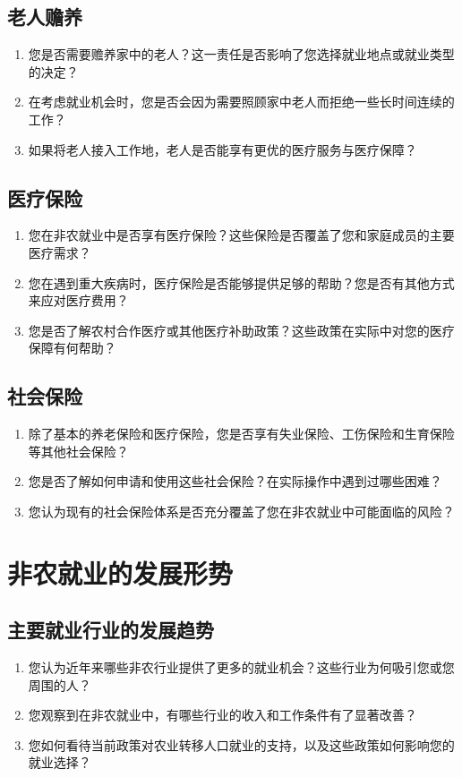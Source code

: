 \documentclass[12pt]{article}
\begin{document}
\subsection*{老人赡养}
\begin{enumerate}
    \item 您是否需要赡养家中的老人？这一责任是否影响了您选择就业地点或就业类型的决定？
    \item 在考虑就业机会时，您是否会因为需要照顾家中老人而拒绝一些长时间连续的工作？
    \item 如果将老人接入工作地，老人是否能享有更优的医疗服务与医疗保障？
\end{enumerate}

\subsection*{医疗保险}
\begin{enumerate}
    \item 您在非农就业中是否享有医疗保险？这些保险是否覆盖了您和家庭成员的主要医疗需求？
    \item 您在遇到重大疾病时，医疗保险是否能够提供足够的帮助？您是否有其他方式来应对医疗费用？
    \item 您是否了解农村合作医疗或其他医疗补助政策？这些政策在实际中对您的医疗保障有何帮助？
\end{enumerate}

\subsection*{社会保险}
\begin{enumerate}
    \item 除了基本的养老保险和医疗保险，您是否享有失业保险、工伤保险和生育保险等其他社会保险？
    \item 您是否了解如何申请和使用这些社会保险？在实际操作中遇到过哪些困难？
    \item 您认为现有的社会保险体系是否充分覆盖了您在非农就业中可能面临的风险？
\end{enumerate}


\section{非农就业的发展形势}

\subsection*{主要就业行业的发展趋势}
\begin{enumerate}
    \item 您认为近年来哪些非农行业提供了更多的就业机会？这些行业为何吸引您或您周围的人？
    \item 您观察到在非农就业中，有哪些行业的收入和工作条件有了显著改善？
    \item 您如何看待当前政策对农业转移人口就业的支持，以及这些政策如何影响您的就业选择？
\end{enumerate}
\end{document}
